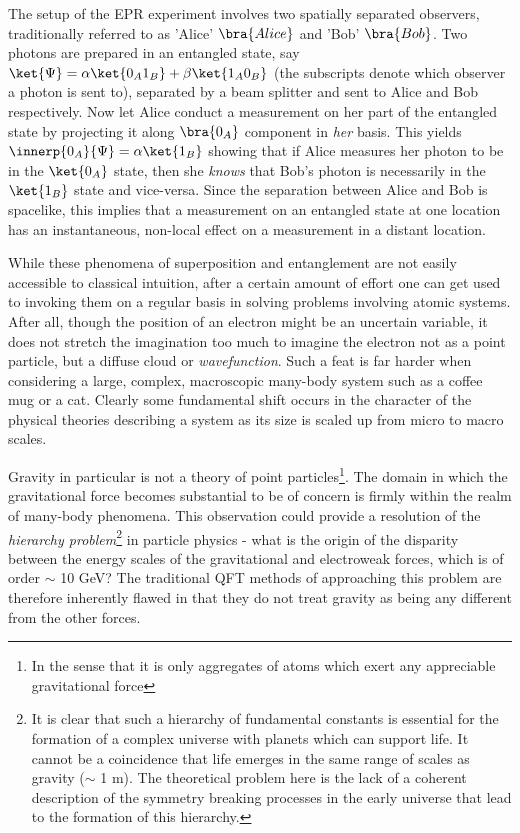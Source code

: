 \documentclass[11pt,english,rmp]{revtex4}
\begin{document}
The setup of the EPR experiment involves two spatially separated observers, traditionally referred to as 'Alice' $\bra{Alice} $ and 'Bob' $\bra{Bob}$. Two photons are prepared in an entangled state, say $\ket{\Psi} = \alpha \ket{0_A 1_B} + \beta \ket{1_A 0_B}$ (the subscripts denote which observer a photon is sent to), separated by a beam splitter and sent to Alice and Bob respectively. Now let Alice conduct a measurement on her part of the entangled state by projecting it along $\bra{0_A}$ component in \emph{her}  basis. This yields $\innerp{0_A}{\Psi} = \alpha \ket{1_B}$ showing that if Alice measures her photon to be in the $\ket{0_A}$ state, then she \emph{knows} that Bob's photon is necessarily in the $\ket{1_B}$ state and vice-versa. Since the separation between Alice and Bob is spacelike, this implies that a measurement on an entangled state at one location has an instantaneous, non-local effect on a measurement in a distant location.

While these phenomena of superposition and entanglement are not easily accessible to classical intuition, after a certain amount of effort one can get used to invoking them on a regular basis in solving problems involving atomic systems. After all, though the position of an electron might be an uncertain variable, it does not stretch the imagination too much to imagine the electron not as a point particle, but a diffuse cloud or \emph{wavefunction}. Such a feat is far harder when considering a large, complex, macroscopic many-body system such as a coffee mug or a cat. Clearly some fundamental shift occurs in the character of the physical theories describing a system as its size is scaled up from micro to macro scales.

Gravity in particular is not a theory of point particles\footnote{In the sense that it is only aggregates of atoms which exert any appreciable gravitational force}. The domain in which the gravitational force becomes substantial to be of concern is firmly within the realm of many-body phenomena. This observation could provide a resolution of the \emph{hierarchy problem}\footnote{It is clear that such a hierarchy of fundamental constants is essential for the formation of a complex universe with planets which can support life. It cannot be a coincidence that life emerges in the same range of scales as gravity ($\sim$ 1 m). The theoretical problem here is the lack of a coherent description of the symmetry breaking processes in the early universe that lead to the formation of this hierarchy.} in particle physics - what is the origin of the disparity between the energy scales of the gravitational and electroweak forces, which is of order $\sim$ 10 GeV? The traditional QFT methods of approaching this problem are therefore inherently flawed in that they do not treat gravity as being any different from the other forces.
\end{document}
